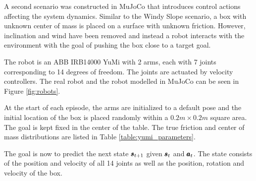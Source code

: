 A second scenario was constructed in MuJoCo that introduces control actions affecting the system dynamics. Similar to the Windy Slope scenario, a box with unknown center of mass is placed on a surface with unknown friction. However, inclination and wind have been removed and instead a robot interacts with the environment with the goal of pushing the box close to a target goal.

The robot is an ABB IRB14000 YuMi with 2 arms, each with 7 joints corresponding to 14 degrees of freedom. The joints are actuated by velocity controllers. The real robot and the robot modelled in MuJoCo can be seen in Figure \ref{fig:robots}. 

At the start of each episode, the arms are initialized to a default pose and the initial location of the box is placed randomly within a $0.2m \times 0.2m$ square area. The goal is kept fixed in the center of the table. The true friction and center of mass distributions are listed in Table \ref{table:yumi_parameters}.

The goal is now to predict the next state $\pmb{s}_{t+1}$ given $\pmb{s}_t$ and $\pmb{a}_t$. The state consists of the position and velocity of all 14 joints as well as the position, rotation and velocity of the box.



